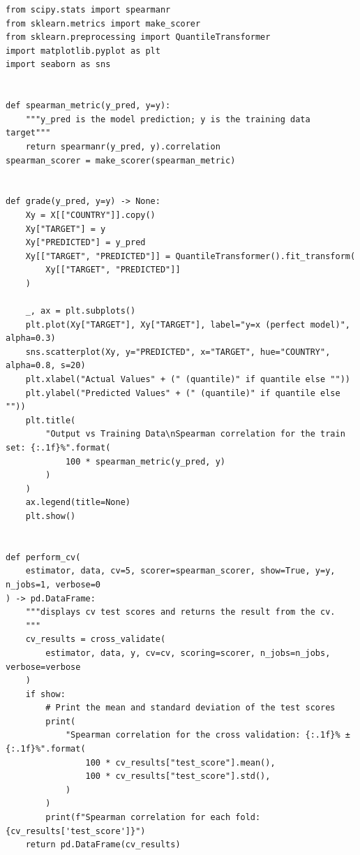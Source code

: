 \documentclass[11pt]{article}
\theoremstyle{definition}
\begin{document}
\begin{verbatim}
from scipy.stats import spearmanr
from sklearn.metrics import make_scorer
from sklearn.preprocessing import QuantileTransformer
import matplotlib.pyplot as plt
import seaborn as sns


def spearman_metric(y_pred, y=y):
    """y_pred is the model prediction; y is the training data target"""
    return spearmanr(y_pred, y).correlation
spearman_scorer = make_scorer(spearman_metric)


def grade(y_pred, y=y) -> None:
    Xy = X[["COUNTRY"]].copy()
    Xy["TARGET"] = y
    Xy["PREDICTED"] = y_pred
    Xy[["TARGET", "PREDICTED"]] = QuantileTransformer().fit_transform(
        Xy[["TARGET", "PREDICTED"]]
    )

    _, ax = plt.subplots()
    plt.plot(Xy["TARGET"], Xy["TARGET"], label="y=x (perfect model)", alpha=0.3)
    sns.scatterplot(Xy, y="PREDICTED", x="TARGET", hue="COUNTRY", alpha=0.8, s=20)
    plt.xlabel("Actual Values" + (" (quantile)" if quantile else ""))
    plt.ylabel("Predicted Values" + (" (quantile)" if quantile else ""))
    plt.title(
        "Output vs Training Data\nSpearman correlation for the train set: {:.1f}%".format(
            100 * spearman_metric(y_pred, y)
        )
    )
    ax.legend(title=None)
    plt.show()


def perform_cv(
    estimator, data, cv=5, scorer=spearman_scorer, show=True, y=y, n_jobs=1, verbose=0
) -> pd.DataFrame:
    """displays cv test scores and returns the result from the cv.
    """
    cv_results = cross_validate(
        estimator, data, y, cv=cv, scoring=scorer, n_jobs=n_jobs, verbose=verbose
    )
    if show:
        # Print the mean and standard deviation of the test scores
        print(
            "Spearman correlation for the cross validation: {:.1f}% ± {:.1f}%".format(
                100 * cv_results["test_score"].mean(),
                100 * cv_results["test_score"].std(),
            )
        )
        print(f"Spearman correlation for each fold: {cv_results['test_score']}")
    return pd.DataFrame(cv_results)
\end{verbatim}
\end{document}
